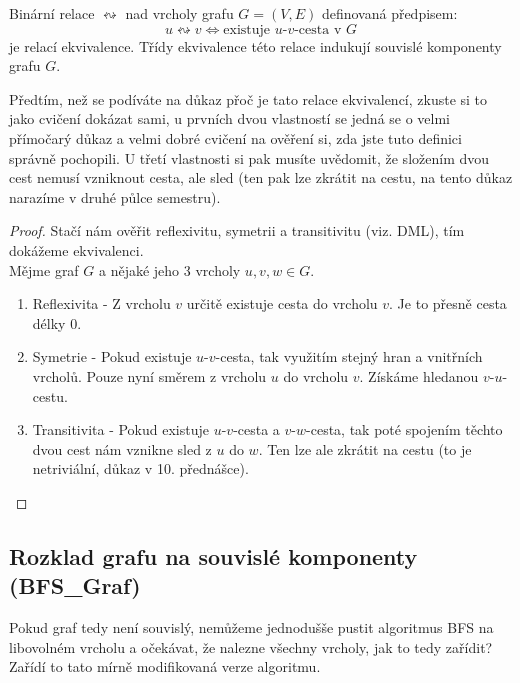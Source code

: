 \begin{theorem}
Binární relace $\leftrightsquigarrow$ nad vrcholy grafu $G = (V, E)$ definovaná předpisem:
$$u \leftrightsquigarrow v \iff \text{existuje } u\text{-}v\text{-cesta v } G$$
je relací ekvivalence. Třídy ekvivalence této relace indukují souvislé komponenty grafu $G$.
\end{theorem} \bigskip

\noindent Předtím, než se podíváte na důkaz přoč je tato relace ekvivalencí, zkuste si to jako cvičení dokázat sami, u prvních dvou vlastností se jedná se o velmi přímočarý důkaz a velmi dobré cvičení na ověření si, zda jste tuto definici správně pochopili. U třetí vlastnosti si pak musíte uvědomit, že složením dvou cest nemusí vzniknout cesta, ale sled (ten pak lze zkrátit na cestu, na tento důkaz narazíme v druhé půlce semestru).

\begin{proof}
    Stačí nám ověřit reflexivitu, symetrii a transitivitu (viz. DML), tím dokážeme ekvivalenci. \\
    
    \noindent Mějme graf $G$ a nějaké jeho 3 vrcholy $u, v, w \in G$.

    \begin{enumerate}
        \item Reflexivita - Z vrcholu $v$ určitě existuje cesta do vrcholu $v$. Je to    přesně cesta délky 0.
        \item Symetrie - Pokud existuje $u$-$v$-cesta, tak využitím stejný hran a          vnitřních vrcholů. Pouze nyní směrem z vrcholu $u$ do vrcholu $v$. Získáme hledanou $v$-$u$-cestu.
        \item Transitivita - Pokud existuje $u$-$v$-cesta a $v$-$w$-cesta, tak poté spojením těchto dvou cest nám vznikne sled z $u$ do $w$. Ten lze ale zkrátit na cestu (to je netriviální, důkaz v 10. přednášce).
    \end{enumerate}
\end{proof}

\subsection{Rozklad grafu na souvislé komponenty (BFS\_Graf)}

Pokud graf tedy není souvislý, nemůžeme jednodušše pustit algoritmus BFS na libovolném vrcholu a očekávat, že nalezne všechny vrcholy, jak to tedy zařídit? Zařídí to tato mírně modifikovaná verze algoritmu.

